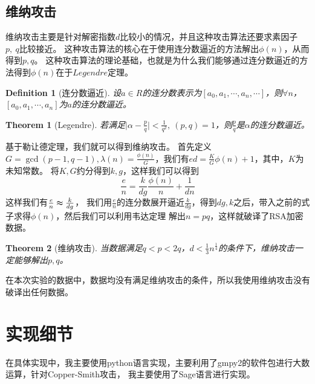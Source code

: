 \documentclass{ctexart}
\newtheorem{theorem}{Theorem}
\newtheorem{definition}{Definition}
\begin{document}
\subsection{维纳攻击}
维纳攻击主要是针对解密指数$d$比较小的情况，并且这种攻击算法还要求素因子$p,\ q$比较接近。
这种攻击算法的核心在于使用连分数逼近的方法解出$\phi(n)$，从而得到$p,q$。
这种攻击算法的理论基础，也就是为什么我们能够通过连分数逼近的方法得到$\phi(n)$在于$Legendre$定理。
\begin{definition}[连分数逼近]
    设$a\in R$的连分数表示为$[a_0,a_1,\cdots,a_n,\cdots]$，则$\forall n$，$[a_0,a_1,\cdots,a_n]$为$a$的连分数逼近。
\end{definition}
\begin{theorem}[Legendre]
    若满足$\vert\alpha-\frac{p}{q}\vert<\frac{1}{q^2},\ (p,q)=1$，则$\frac{p}{q}$是$\alpha$的连分数逼近。
\end{theorem}
基于勒让德定理，我们就可以得到维纳攻击。
首先定义$G=\gcd(p-1,q-1), \lambda(n)=\frac{\phi(n)}{G}$，我们有$ed=\frac{K}{G}\phi(n)+1$，其中，$K$为未知常数。
将$K,G$约分得到$k,g$，这样我们可以得到
$$
\frac{e}{n}=\frac{k}{dg}\frac{\phi(n)}{n}+\frac{1}{dn}
$$
这样我们有$\frac{e}{n}\thickapprox \frac{k}{dg}$，
我们用$\frac{e}{n}$的连分数展开逼近$\frac{k}{dg}$，得到$dg,k$之后，带入之前的式子求得$\phi(n)$，然后我们可以利用韦达定理
解出$n=pq$，这样就破译了RSA加密数据。
\begin{theorem}[维纳攻击]
    当数据满足$q<p<2q$，$d<\frac{1}{3}n^{\frac{1}{4}}$的条件下，维纳攻击一定能够解出$p,q$。
\end{theorem}
在本次实验的数据中，数据均没有满足维纳攻击的条件，所以我使用维纳攻击没有破译出任何数据。
\section{实现细节}
在具体实现中，我主要使用python语言实现，主要利用了gmpy2的软件包进行大数运算，针对Copper-Smith攻击，
我主要使用了Sage语言进行实现。
\end{document}

